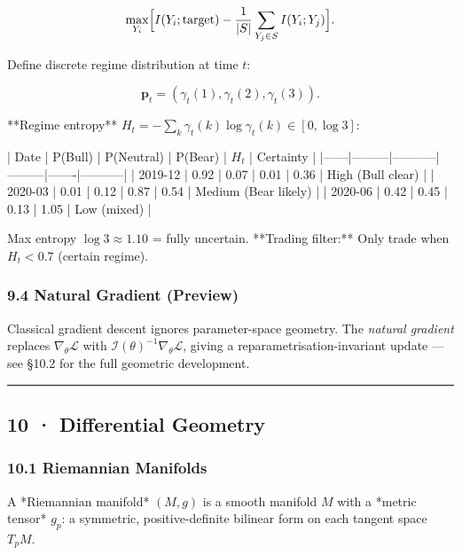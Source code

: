 \documentclass[11pt,a4paper]{article}
\begin{document}
\[\max_{Y_i} \Bigl[I(Y_i;\text{target}) - \frac{1}{|S|}\sum_{Y_j\in S}I(Y_i;Y_j)\Bigr].\]

\begin{tcolorbox}[colback=notebg!60,colframe=optgreen,fonttitle=\bfseries\sffamily,title={\textsf{\textbf{Example}} — Example — Entropy of HMM Regime Probabilities},breakable]
Define discrete regime distribution at time $t$:

$$\mathbf{p}_t = (\gamma_t(1), \gamma_t(2), \gamma_t(3)).$$

**Regime entropy** $H_t = -\sum_k \gamma_t(k)\log \gamma_t(k) \in [0, \log 3]$:

| Date | P(Bull) | P(Neutral) | P(Bear) | $H_t$ | Certainty |
|------|---------|-----------|---------|-------|-----------|
| 2019-12 | 0.92 | 0.07 | 0.01 | 0.36 | High (Bull clear) |
| 2020-03 | 0.01 | 0.12 | 0.87 | 0.54 | Medium (Bear likely) |
| 2020-06 | 0.42 | 0.45 | 0.13 | 1.05 | Low (mixed) |

Max entropy $\log 3 \approx 1.10$ = fully uncertain.
**Trading filter:** Only trade when $H_t < 0.7$ (certain regime).
\end{tcolorbox}

\subsubsection{9.4 Natural Gradient (Preview)}\label{natural-gradient-preview}

Classical gradient descent ignores parameter-space geometry. The \emph{natural gradient} replaces \(\nabla_\theta\mathcal{L}\) with \(\mathcal{I}(\theta)^{-1}\nabla_\theta\mathcal{L}\), giving a reparametrisation-invariant update --- see §10.2 for the full geometric development.

\begin{center}\rule{0.5\linewidth}{0.5pt}\end{center}

\subsection{10 · Differential Geometry}\label{differential-geometry}

\subsubsection{10.1 Riemannian Manifolds}\label{riemannian-manifolds}

\begin{tcolorbox}[colback=defbg!60,colframe=optblue,fonttitle=\bfseries\sffamily,title={\textsf{\textbf{Definition}} — Definition — Riemannian Manifold},breakable]
A *Riemannian manifold* $(M, g)$ is a smooth manifold $M$ with a
*metric tensor* $g_p$: a symmetric, positive-definite bilinear form on each
tangent space $T_p M$.
\end{tcolorbox}
\end{document}
